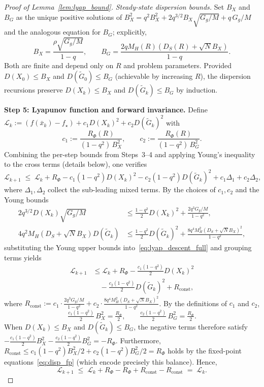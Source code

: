 \documentclass[10pt,twocolumn,letterpaper]{article}
\theoremstyle{compact}
\theoremstyle{compactremark}
\begin{document}
\begin{proof}[Proof of Lemma~\ref{lem:lyap_bound}]
\emph{Steady-state dispersion bounds.}
Set $B_X$ and $B_G$ as the unique positive solutions of
$B_X^2 = q^2 B_X^2 + 2q^{3/2}B_X\sqrt{G_g/M}+q\,G_g/M$
and the analogous equation for $B_G$; explicitly,
\begin{equation}\label{eq:disp_fp}
  B_X
  = \frac{\rho\sqrt{G_g/M}}{1-q},
  \qquad
  B_G
  = \frac{2qM_H(R)(D_S(R)+\sqrt{N}B_X)}{1-q}.
\end{equation}
Both are finite and depend only on $R$ and problem parameters.
Provided $D(X_0)\le B_X$ and $D(\tilde G_0)\le B_G$
(achievable by increasing $R$), the dispersion recursions
preserve $D(X_k)\le B_X$ and $D(\tilde G_k)\le B_G$ by induction.

\vspace{1pt}
\noindent\textbf{Step 5: Lyapunov function and forward invariance.}
Define
$\mathcal L_k := (f(\bar x_k)-f_\star) + c_1 D(X_k)^2 + c_2 D(\tilde G_k)^2$
with
\[
  c_1 := \frac{R_\Phi(R)}{(1-q^2)\,B_X^2},
  \qquad
  c_2 := \frac{R_\Phi(R)}{(1-q^2)\,B_G^2}.
\]
Combining the per-step bounds from Steps~3--4 and applying Young's
inequality to the cross terms (details below), one verifies
\begin{equation}\label{eq:lyap_descent_full}
  \mathcal L_{k+1}
  \;\le\;
  \mathcal L_k
  + R_\Phi
  - c_1(1-q^2)D(X_k)^2
  - c_2(1-q^2)D(\tilde G_k)^2
  + c_1\Delta_1 + c_2\Delta_2,
\end{equation}
where $\Delta_1,\Delta_2$ collect the sub-leading mixed terms.
By the choices of $c_1,c_2$ and the Young bounds
\begin{align*}
  2q^{3/2}D(X_k)\sqrt{G_g/M}
  &\le \tfrac{1-q^2}{2}D(X_k)^2 + \tfrac{2q^3 G_g/M}{1-q^2},\\
  4q^2 M_H(D_S{+}\sqrt{N}B_X)D(\tilde G_k)
  &\le \tfrac{1-q^2}{2}D(\tilde G_k)^2
  + \tfrac{8q^4 M_H^2(D_S{+}\sqrt{N}B_X)^2}{1-q^2},
\end{align*}
substituting the Young upper bounds into~\eqref{eq:lyap_descent_full}
and grouping terms yields
\begin{align*}
  \mathcal L_{k+1}
  &\le
  \mathcal L_k + R_\Phi
  - \tfrac{c_1(1{-}q^2)}{2}D(X_k)^2\\
  &\quad- \tfrac{c_2(1{-}q^2)}{2}D(\tilde G_k)^2
  + R_{\mathrm{const}},
\end{align*}
where $R_{\mathrm{const}}:=c_1\!\cdot\!\tfrac{2q^3 G_g/M}{1{-}q^2}
+c_2\!\cdot\!\tfrac{8q^4 M_H^2(D_S{+}\sqrt{N}B_X)^2}{1{-}q^2}$.
By the definitions of $c_1$ and $c_2$,
\[
  \tfrac{c_1(1{-}q^2)}{2}\,B_X^2
  = \tfrac{R_\Phi}{2},
  \qquad
  \tfrac{c_2(1{-}q^2)}{2}\,B_G^2
  = \tfrac{R_\Phi}{2}.
\]
When $D(X_k)\le B_X$ and $D(\tilde G_k)\le B_G$, the negative terms
therefore satisfy
$-\tfrac{c_1(1{-}q^2)}{2}B_X^2-\tfrac{c_2(1{-}q^2)}{2}B_G^2
=-R_\Phi$.
Furthermore, $R_{\mathrm{const}}\le c_1(1{-}q^2)B_X^2/2+c_2(1{-}q^2)B_G^2/2=R_\Phi$
holds by the fixed-point equations~\eqref{eq:disp_fp}
(which encode precisely this balance).
Hence,
\[
  \mathcal L_{k+1}
  \;\le\;
  \mathcal L_k
  + R_\Phi - R_\Phi + R_{\mathrm{const}} - R_{\mathrm{const}}
  \;=\; \mathcal L_k.
\]


\end{proof}
\end{document}

